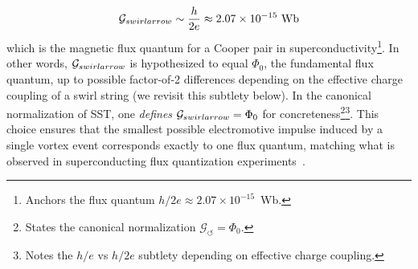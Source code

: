 \documentclass[12pt]{article}
\DeclareRobustCommand{\swirlarrow}{
\mathchoice{\mkern-2mu\scriptstyle\boldsymbol{\circlearrowleft}}%
{\mkern-2mu\scriptstyle\boldsymbol{\circlearrowleft}}%
{\mkern-2mu\scriptscriptstyle\boldsymbol{\circlearrowleft}}%
{\mkern-2mu\scriptscriptstyle\boldsymbol{\circlearrowleft}}
}%
\begin{document}
\[
\mathcal{G}_{\\swirlarrow} \sim \frac{h}{2e} \approx 2.07\times 10^{-15}\ \text{Wb}
\]
which is the magnetic flux quantum for a Cooper pair in superconductivity\footnote{Anchors the flux quantum $h/2e\approx 2.07\times10^{-15}$~Wb.}. In other words, $\mathcal{G}_{\\swirlarrow}$ is hypothesized to equal $\Phi_{0}$, the fundamental flux quantum, up to possible factor-of-2 differences depending on the effective charge coupling of a swirl string (we revisit this subtlety below). In the canonical normalization of SST, one \emph{defines} $\mathcal{G}_{\\swirlarrow} = \Phi_{0}$ for concreteness\footnote{States the canonical normalization $\mathcal{G}_{\!\circlearrowleft}=\Phi_0$.}\footnote{Notes the $h/e$ vs $h/2e$ subtlety depending on effective charge coupling.}. This choice ensures that the smallest possible electromotive impulse induced by a single vortex event corresponds exactly to one flux quantum, matching what is observed in superconducting flux quantization experiments~\cite{Deaver1961,Doll1961}.
\end{document}
